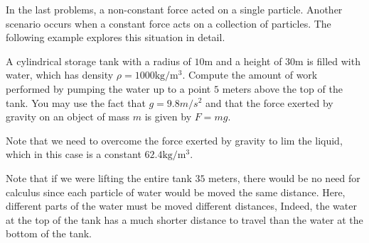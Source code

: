 \documentclass{ximera}
\begin{document}
In the last problems, a non-constant force acted on a single particle.  Another scenario occurs when a constant force acts on a collection of particles.  The following example explores this situation in detail.

\begin{model}
  A cylindrical storage tank with a radius of $10 \mathrm{m}$ and a height of $30\mathrm{m}$ is filled with water, which has density
$\rho=1000 \mathrm{kg}/\mathrm{m}^3$. Compute the amount of work performed by pumping the water up to a point $5$ meters above the top of the tank.  You may use the fact that $g=9.8m/s^2$ and that the force exerted by gravity on an object of mass $m$ is given by $F=mg$.
  \begin{explanation}
  

Note that we need to overcome the force exerted by gravity to lim the liquid, which in this case is a constant $62.4 \mathrm{kg}/\mathrm{m}^3$.

\begin{multipleChoice}
\end{multipleChoice}

Note that if we were lifting the entire tank $35$ meters, there would be no need for calculus since each particle of water would be moved the same distance.  Here, different parts of the water must be moved different distances,  Indeed,  the water at the top of the tank has a much shorter distance to travel than the water at the bottom of the tank.
	

\end{explanation}
\end{model}
\end{document}
